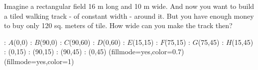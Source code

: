 
%
%
%
%
% 
% 

\question[2] Imagine a rectangular field 16 m long and 10 m wide. And now you want
to build a tiled walking track - of constant width - around it. But you have enough 
money to buy only 120 sq. meters of tile. How wide can you make the track then?


\ifprintanswers
  \begin{marginfigure}
      : $A$(0,0)
      : $B$(90,0)
      : $C$(90,60)
      : $D$(0,60)
      : $E$(15,15)
      : $F$(75,15)
      : $G$(75,45)
      : $H$(15,45)
      : (0,15)
      : (90,15)
      : (90,45)
      : (0,45)
    \figdrawbegin{}
      \figset (fillmode=yes,color=0.7)
      \figdrawline [100,101,102,103,100]
      \figset (fillmode=yes,color=1)
      \figdrawline [104,105,106,107,104]
    \figdrawend
    \centerline{\box\figBoxA}
  \end{marginfigure}
\fi 

